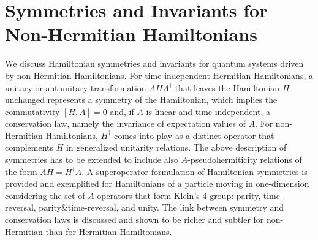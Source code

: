 
\chapter{Symmetries and Invariants for Non-Hermitian Hamiltonians}
\label{ChapterSymAndInvariants}
%
We discuss Hamiltonian symmetries and invariants for quantum systems driven by
non-Hermitian Hamiltonians. For time-independent Hermitian Hamiltonians, a unitary or antiunitary transformation
$AHA^\dagger$ that leaves the Hamiltonian $H$
unchanged represents a symmetry of the Hamiltonian, which implies the commutativity $[H,A]=0$
and, if $A$ is linear and  time-independent,  a conservation law,
namely the invariance of expectation values of $A$.
For non-Hermitian Hamiltonians, $H^\dagger$ comes into play as a distinct operator that complements $H$
in generalized unitarity relations.
The above description of symmetries has to be extended to include also $A$-pseudohermiticity
relations of the form
$AH=H^\dagger A$. A superoperator formulation of Hamiltonian symmetries is provided and exemplified
for Hamiltonians
of a particle moving in one-dimension considering  the set of $A$ operators
that form Klein's 4-group: parity, time-reversal, parity\&time-reversal, and unity.
The link between symmetry and conservation laws is
discussed and shown to be richer and subtler for non-Hermitian than for Hermitian Hamiltonians.
%
\newpage
%


